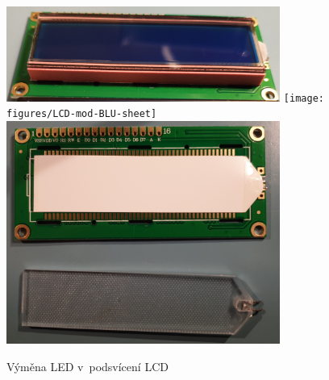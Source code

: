 \begin{figure}[htbp]
    \centering
    \includegraphics[width=0.8\textwidth]{figures/LCD-mod-disassembly}
    \texttt{[image: figures/LCD-mod-BLU-sheet]}
    \includegraphics[width=0.8\textwidth]{figures/LCD-mod-BLU-plexiglass}
    \caption{Výměna LED v~podsvícení LCD}
    \label{fig:LCD modifikace}
\end{figure}

